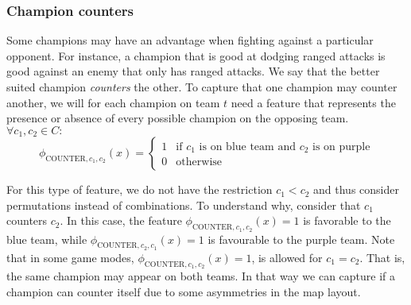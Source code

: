 \subsubsection{Champion counters}
Some champions may have an advantage when fighting against a particular opponent.
For instance, a champion that is good at dodging ranged attacks is good against an enemy that only has ranged attacks.
We say that the better suited champion \emph{counters} the other.
To capture that one champion may counter another, we will for each champion on team $t$ need a feature that represents the presence or absence of every possible champion on the opposing team. $\forall c_1, c_2 \in C:$
\begin{equation}\label{eq:counter}
\phi_{\text{COUNTER},c_1,c_2}(x) = 
\begin{cases} 
1 & \text{if } c_1 \text{ is on blue team and } c_2 \text{ is on purple} \\ 
0 & \text{otherwise} 
\end{cases}
\end{equation}

For this type of feature, we do not have the restriction $c_1 < c_2$ and thus consider permutations instead of combinations.
To understand why, consider that $c_1$ counters $c_2$.
In this case, the feature $\phi_{\text{COUNTER},c_1,c_2}(x) = 1$ is favorable to the blue team, while $\phi_{\text{COUNTER},c_2,c_1}(x) = 1$ is favourable to the purple team.
Note that in some game modes, $\phi_{\text{COUNTER},c_1,c_2}(x) = 1$, is allowed for $c_1 = c_2$. That is, the same champion may appear on both teams.
In that way we can capture if a champion can counter itself due to some asymmetries in the map layout.

